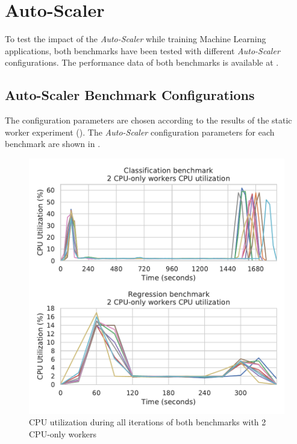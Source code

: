\section{Auto-Scaler}
\label{sec:07_auto-scaler}
To test the impact of the \textit{Auto-Scaler} while training Machine Learning applications, both benchmarks have been tested with different \textit{Auto-Scaler} configurations.
The performance data of both benchmarks is available at .


\subsection{Auto-Scaler Benchmark Configurations}
The configuration parameters are chosen according to the results of the static worker experiment ().
The \textit{Auto-Scaler} configuration parameters for each benchmark are shown in .
\begin{figure}[h]
\centering
\includegraphics[scale=0.9]{images/07_evaluation/overall_auto-scaler_iterations}
\caption{CPU utilization during all iterations of both benchmarks with 2 CPU-only workers}
\label{fig:07_auto-scaler_iterations_results}
\end{figure}
